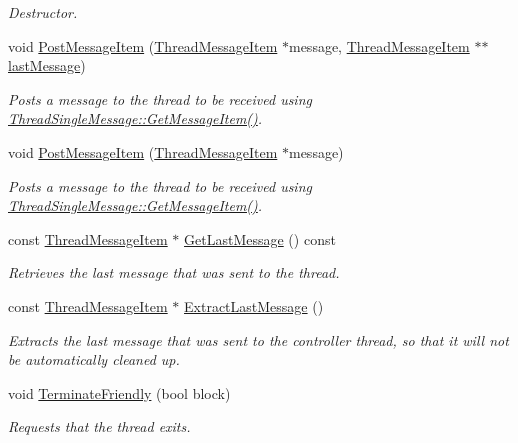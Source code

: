 \begin{DoxyCompactItemize}
\begin{DoxyCompactList}\small\item\em Destructor. \item\end{DoxyCompactList}\item 
void \hyperlink{class_thread_single_message_keep_last_a27f81a79a325c68fb5257875e074924c}{PostMessageItem} (\hyperlink{class_thread_message_item}{ThreadMessageItem} $\ast$message, \hyperlink{class_thread_message_item}{ThreadMessageItem} $\ast$$\ast$\hyperlink{class_thread_single_message_keep_last_ae36c3229c8538b56a7fc4740a5d58d4f}{lastMessage})
\begin{DoxyCompactList}\small\item\em Posts a message to the thread to be received using \hyperlink{class_thread_single_message_ac6385cefd086e9c40aa28241caa08d09}{ThreadSingleMessage::GetMessageItem()}. \item\end{DoxyCompactList}\item 
void \hyperlink{class_thread_single_message_keep_last_a75fcc872de92fedf3dc60719d2d44761}{PostMessageItem} (\hyperlink{class_thread_message_item}{ThreadMessageItem} $\ast$message)
\begin{DoxyCompactList}\small\item\em Posts a message to the thread to be received using \hyperlink{class_thread_single_message_ac6385cefd086e9c40aa28241caa08d09}{ThreadSingleMessage::GetMessageItem()}. \item\end{DoxyCompactList}\item 
const \hyperlink{class_thread_message_item}{ThreadMessageItem} $\ast$ \hyperlink{class_thread_single_message_keep_last_a84eda7c55772bdba5344de44b7ae1f1f}{GetLastMessage} () const 
\begin{DoxyCompactList}\small\item\em Retrieves the last message that was sent to the thread. \item\end{DoxyCompactList}\item 
const \hyperlink{class_thread_message_item}{ThreadMessageItem} $\ast$ \hyperlink{class_thread_single_message_keep_last_a33163bff070c44bd1d7bcaa68e678698}{ExtractLastMessage} ()
\begin{DoxyCompactList}\small\item\em Extracts the last message that was sent to the controller thread, so that it will not be automatically cleaned up. \item\end{DoxyCompactList}\item 
void \hyperlink{class_thread_single_message_keep_last_a408f2a12f684c32cb640c3b17f74f933}{TerminateFriendly} (bool block)
\begin{DoxyCompactList}\small\item\em Requests that the thread exits. \item\end{DoxyCompactList}\end{DoxyCompactItemize}

